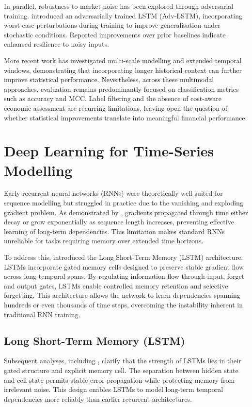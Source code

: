 \documentclass{l4proj}
\begin{document}
In parallel, robustness to market noise has been explored through adversarial training. \citet{feng2019enhancingstockmovementprediction} introduced an adversarially trained LSTM (Adv-LSTM), incorporating worst-case perturbations during training to improve generalisation under stochastic conditions. Reported improvements over prior baselines indicate enhanced resilience to noisy inputs. 

More recent work has investigated multi-scale modelling and extended temporal windows, demonstrating that incorporating longer historical context can further improve statistical performance. Nevertheless, across these multimodal approaches, evaluation remains predominantly focused on classification metrics such as accuracy and MCC. Label filtering and the absence of cost-aware economic assessment are recurring limitations, leaving open the question of whether statistical improvements translate into meaningful financial performance.

\section{Deep Learning for Time-Series Modelling}

Early recurrent neural networks (RNNs) were theoretically well-suited for sequence modelling but struggled in practice due to the vanishing and exploding gradient problem. As demonstrated by \citet{hochreiter1997long}, gradients propagated through time either decay or grow exponentially as sequence length increases, preventing effective learning of long-term dependencies. This limitation makes standard RNNs unreliable for tasks requiring memory over extended time horizons.

To address this, \citet{hochreiter1997long} introduced the Long Short-Term Memory (LSTM) architecture. LSTMs incorporate gated memory cells designed to preserve stable gradient flow across long temporal spans. By regulating information flow through input, forget and output gates, LSTMs enable controlled memory retention and selective forgetting. This architecture allows the network to learn dependencies spanning hundreds or even thousands of time steps, overcoming the instability inherent in traditional RNN training.

\subsection{Long Short-Term Memory (LSTM)}

Subsequent analyses, including \citet{staudemeyer2019understandinglstmtutorial}, clarify that the strength of LSTMs lies in their gated structure and explicit memory cell. The separation between hidden state and cell state permits stable error propagation while protecting memory from irrelevant noise. This design enables LSTMs to model long-term temporal dependencies more reliably than earlier recurrent architectures.
\end{document}

